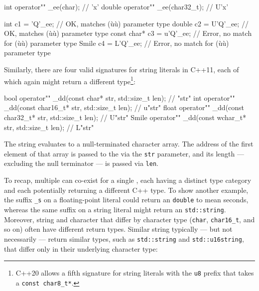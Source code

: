 \begin{emcppslisting}[emcppsbatch=e10]
int    operator"" _ee(char);      //  'x'
double operator"" _ee(char32_t);  // U'x'

int         c1 =  'Q'_ee;  // OK, matches (ù{}ù) parameter type
double      c2 = U'Q'_ee;  // OK, matches (ù{}ù) parameter type
const char* c3 = u'Q'_ee;  // Error, no match for (ù{}ù) parameter type
Smile       c4 = L'Q'_ee;  // Error, no match for (ù{}ù) parameter type
\end{emcppslisting}

\noindent Similarly, there are four valid  signatures for
string literals in C++11, each of which again might
return a different type{\cprotect\footnote{C++20 allows a fifth signature for
string literals with the \lstinline!u8! prefix that takes a \lstinline!const char8_t*!.}}:

\begin{emcppslisting}[emcppsbatch=e10]
bool  operator"" _dd(const char*     str, std::size_t len);  //   "str"
int   operator"" _dd(const char16_t* str, std::size_t len);  //  u"str"
float operator"" _dd(const char32_t* str, std::size_t len);  //  U"str"
Smile operator"" _dd(const wchar_t*  str, std::size_t len);  //  L"str"
\end{emcppslisting}

\noindent The string  evaluates to a null-terminated
character array. The address of the first element of that array is
passed to the  via the \lstinline!str! parameter, and
its length --- excluding the null terminator --- is passed via \lstinline!len!.

To recap, multiple  can co-exist
for a single , each having a distinct type category
and each potentially returning a different C++ type. To show another
example, the suffix \lstinline!_s! on a floating-point literal could
return an \lstinline!double! to mean seconds, whereas the same suffix on a
string literal might return an \lstinline!std::string!. Moreover, string and character
 that differ by character type (\lstinline!char!,
\lstinline!char16_t!, and so on) often have different return types.
Similar string  typically --- but not necessarily
--- return similar types, such as \lstinline!std::string! and
\lstinline!std::u16string!, that differ only in their underlying character
type:

